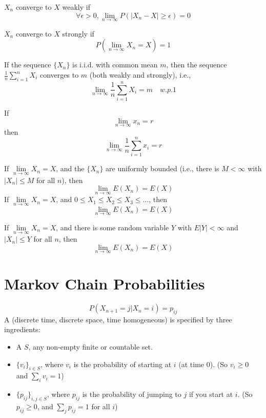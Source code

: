 \documentclass[11pt]{article}
\renewcommand{\limit}[1]{\underset{{#1} \rightarrow \infty}{\lim}}
\begin{document}
    $X_n$ converge to $X$ weakly if 
    $$\forall \epsilon > 0, \limit{n}P(|X_n - X| \geq \epsilon) = 0$$
   
    $X_n$ converge to $X$ strongly if 
    $$P(\limit{n}X_n = X) = 1$$ 
    
    If the sequence $\{X_n\}$ is i.i.d. with common mean $m$, then the sequence $\frac{1}{n}\sum_{i=1}^n X_i$ converges to $m$ (both weakly and strongly), i.e.,
    $$\limit{n} \frac{1}{n}\sum_{i=1}^nX_i = m \quad w.p. 1$$ 
    
  	If $$\limit{n} x_n = r$$then $$\limit{n} \frac{1}{n}\sum_{i=1}^n x_i = r$$
  	
  	If $\limit{n} X_n = X$, and the $\{X_n\}$ are uniformly bounded (i.e., there is $M < \infty$ with $|X_n| \leq M$ for all $n$), then
  	$$\limit{n}E(X_n) = E(X)$$
  	 If $\limit{n}X_n = X$, and $0 \leq X_1 \leq X_2 \leq X_3 \leq \hdots$, then
  	$$\limit{n}E(X_n) = E(X)$$
  	
    If $\limit{n} X_n = X$, and there is some random variable $Y$ with $E|Y|<\infty$ and $|X_n| \leq Y$ for all $n$, then $$\limit{n} E(X_n) = E(X)$$


    \section{Markov Chain Probabilities}
    \notation
    $$P(X_{n+1} = j | X_n = i) = p_{ij}$$
     A (discrete time, discrete space, time homogeneous)  is specified by three ingredients:
    \begin{itemize}
    	\item A  $S$, any non-empty finite or countable set.
    	\item {} $\{v_i\}_{i \in S}$, where $v_i$ is the probability of starting at $i$ (at time 0). (So $v_i \geq 0$ and $\sum_i v_i = 1$)
    	\item {} $\{p_{ij}\}_{i, j\in S}$, where $p_{ij}$ is the probability of jumping to $j$ if you start at $i$. (So $p_{ij} \geq 0$, and $\sum_j p_{ij} = 1$ for all $i$)
    \end{itemize}
    
\end{document}
